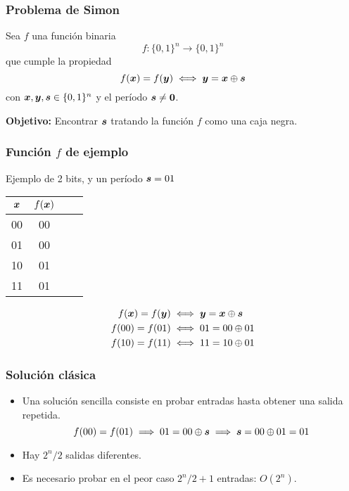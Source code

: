 \begin{frame}
\frametitle{Problema de Simon}

Sea $f$ una función binaria
$$f:\{0,1\}^n \rightarrow \{0,1\}^n$$
que cumple la propiedad
$$ f(\boldsymbol{x}) = f(\boldsymbol{y}) \iff \boldsymbol{y} = \boldsymbol{x} \oplus \boldsymbol{s}$$
con $\boldsymbol{x}, \boldsymbol{y}, \boldsymbol{s} \in \{0,1\}^n$ y el período $\boldsymbol{s} \neq \boldsymbol{0}$.

\vspace{1cm}

\textbf{Objetivo: }Encontrar $\boldsymbol{s}$ tratando la función $f$ como una caja negra.


\end{frame}
\begin{frame}
\frametitle{Función $f$ de ejemplo}

Ejemplo de 2 bits, y un período $\boldsymbol{s} = 01$

\begin{center}
\begin{tabular}{cccc}
	\toprule
	$\boldsymbol{x}$ & $f(\boldsymbol{x})$ \\
	\midrule
	00 & 00 \\
	01 & 00 \\
	10 & 01 \\
	11 & 01 \\
	\bottomrule
\end{tabular}
\end{center}

\begin{equation*}
\begin{split}
f(\boldsymbol{x}) = f(\boldsymbol{y}) &\iff \boldsymbol{y} = \boldsymbol{x} \oplus \boldsymbol{s} \\
f(00) = f(01) & \iff 01 = 00 \oplus 01 \\
f(10) = f(11) & \iff 11 = 10 \oplus 01 \\
\end{split}
\end{equation*}

\end{frame}
\begin{frame}
\frametitle{Solución clásica}
\begin{itemize}
\item Una solución sencilla consiste en probar entradas hasta obtener una salida 
repetida.
%
$$ f(00) = f(01) \implies 01 = 00 \oplus \boldsymbol{s} \implies \boldsymbol{s} = 00 \oplus 01 = 
01$$
%
\item Hay $2^n/2$ salidas diferentes.

\item Es necesario probar en el peor caso $2^n/2 + 1$ entradas: $O(2^n)$.
\end{itemize}
\end{frame}
